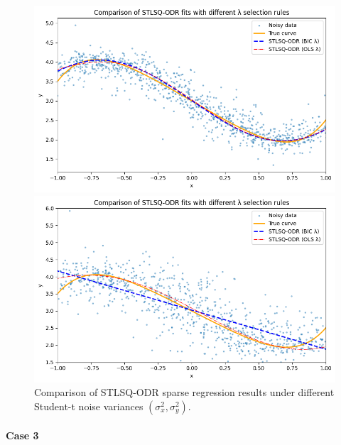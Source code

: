\begin{figure}[htbp]
\begin{minipage}{0.45\textwidth}
    \centering
    \includegraphics[width=\linewidth]{MSc_Statistics_Research_Report_Template/images/t0.1,0.1.png} 
\end{minipage}
\begin{minipage}{0.45\textwidth}
    \centering
    \includegraphics[width=\linewidth]{MSc_Statistics_Research_Report_Template/images/t0.2,0.2.png}
\end{minipage}

\caption{Comparison of STLSQ-ODR sparse regression results under different Student-t noise variances $(\sigma_x^2, \sigma_y^2)$.}
\label{fig:stlsq_odr_t}
\end{figure}

\paragraph{Case 3}

